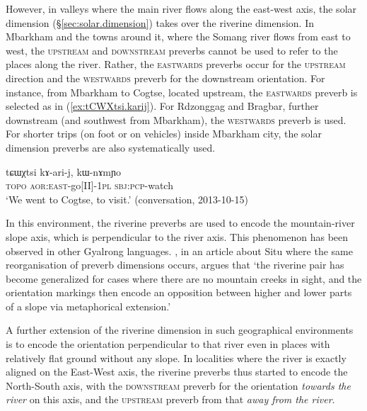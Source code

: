 However, in valleys where the main river flows along the east-west axis, the solar dimension (§\ref{sec:solar.dimension}) takes over the riverine dimension. In Mbarkham and the towns around it, where the Somang river flows from east to west, the \textsc{upstream} and \textsc{downstream} preverbs cannot be used to refer to the places along the river. Rather, the \textsc{eastwards} preverbs occur for the \textsc{upstream} direction and the \textsc{westwards} preverb for the downstream orientation. For instance, from Mbarkham to Cogtse, located upstream, the \textsc{eastwards} preverb is selected as in (\ref{ex:tCWXtsi.karij}). For Rdzonggag and Bragbar, further downstream (and southwest from Mbarkham), the \textsc{westwards} preverb is used. For shorter trips (on foot or on vehicles) inside Mbarkham city, the solar dimension preverbs are also systematically used.

 \begin{exe}
\ex \label{ex:tCWXtsi.karij}
\gll tɕɯχtsi kɤ-ari-j, kɯ-nɤmɲo  \\
\textsc{topo} \textsc{aor}:\textsc{east}-go[II]-\textsc{1pl} \textsc{sbj}:\textsc{pcp}-watch \\
\glt `We went to Cogtse, to visit.' (conversation, 2013-10-15)
\end{exe}

In this environment, the riverine preverbs are used to encode the mountain-river slope axis, which is perpendicular to the river axis. This phenomenon has been observed in other Gyalrong languages. \citet[34]{lin02dimension}, in an article about Situ where the same reorganisation of preverb dimensions occurs, argues that `the riverine pair has become generalized for cases where there are no mountain creeks in sight, and the orientation markings then encode an opposition between higher and lower parts of a slope via metaphorical extension.'

A further extension of the riverine dimension in such geographical environments is to encode the orientation perpendicular to that river even in places with relatively flat ground without any slope. In localities where the river is exactly aligned on the East-West axis, the riverine preverbs thus started to encode the North-South axis, with the \textsc{downstream} preverb for the orientation \textit{towards the river} on this axis, and the \textsc{upstream} preverb from that \textit{away from the river}. %

